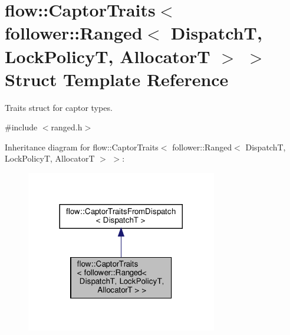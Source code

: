 \hypertarget{structflow_1_1_captor_traits_3_01follower_1_1_ranged_3_01_dispatch_t_00_01_lock_policy_t_00_01_allocator_t_01_4_01_4}{}\section{flow\+:\+:Captor\+Traits$<$ follower\+:\+:Ranged$<$ DispatchT, Lock\+PolicyT, AllocatorT $>$ $>$ Struct Template Reference}
\label{structflow_1_1_captor_traits_3_01follower_1_1_ranged_3_01_dispatch_t_00_01_lock_policy_t_00_01_allocator_t_01_4_01_4}


Traits struct for captor types.  




{\ttfamily \#include $<$ranged.\+h$>$}



Inheritance diagram for flow\+:\+:Captor\+Traits$<$ follower\+:\+:Ranged$<$ DispatchT, Lock\+PolicyT, AllocatorT $>$ $>$\+:\nopagebreak
\begin{figure}[H]
\begin{center}
\leavevmode
\includegraphics[width=236pt]{structflow_1_1_captor_traits_3_01follower_1_1_ranged_3_01_dispatch_t_00_01_lock_policy_t_00_01_ad55b19a8c003c1ac8237867bc0d159c2}
\end{center}
\end{figure}


